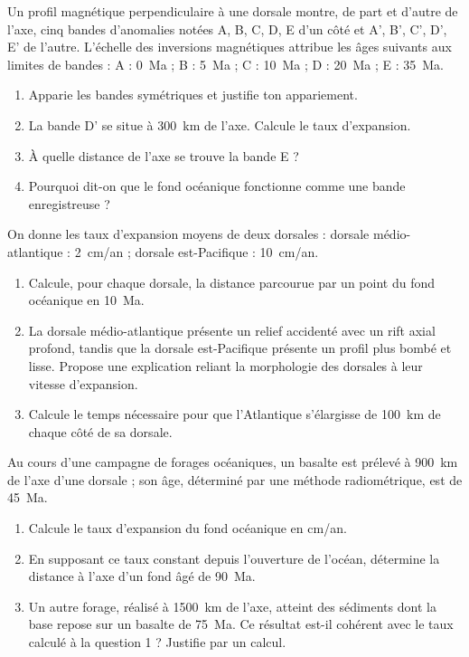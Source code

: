 \documentclass[11pt]{article}
\begin{document}
\begin{exercice}
Un profil magnétique perpendiculaire à une dorsale montre, de part et d'autre de l'axe, cinq bandes d'anomalies notées A, B, C, D, E d'un côté et A', B', C', D', E' de l'autre. L'échelle des inversions magnétiques attribue les âges suivants aux limites de bandes : A : \SI{0}{Ma} ; B : \SI{5}{Ma} ; C : \SI{10}{Ma} ; D : \SI{20}{Ma} ; E : \SI{35}{Ma}.
\begin{enumerate}
\item Apparie les bandes symétriques et justifie ton appariement.
\item La bande D' se situe à \SI{300}{km} de l'axe. Calcule le taux d'expansion.
\item À quelle distance de l'axe se trouve la bande E ?
\item Pourquoi dit-on que le fond océanique fonctionne comme une \og bande enregistreuse \fg{} ?
\end{enumerate}
\end{exercice}

\begin{exercice}
On donne les taux d'expansion moyens de deux dorsales : dorsale médio-atlantique : \SI{2}{cm/an} ; dorsale est-Pacifique : \SI{10}{cm/an}.
\begin{enumerate}
\item Calcule, pour chaque dorsale, la distance parcourue par un point du fond océanique en \SI{10}{Ma}.
\item La dorsale médio-atlantique présente un relief accidenté avec un rift axial profond, tandis que la dorsale est-Pacifique présente un profil plus bombé et lisse. Propose une explication reliant la morphologie des dorsales à leur vitesse d'expansion.
\item Calcule le temps nécessaire pour que l'Atlantique s'élargisse de \SI{100}{km} de chaque côté de sa dorsale.
\end{enumerate}
\end{exercice}

\begin{exercice}
Au cours d'une campagne de forages océaniques, un basalte est prélevé à \SI{900}{km} de l'axe d'une dorsale ; son âge, déterminé par une méthode radiométrique, est de \SI{45}{Ma}.
\begin{enumerate}
\item Calcule le taux d'expansion du fond océanique en cm/an.
\item En supposant ce taux constant depuis l'ouverture de l'océan, détermine la distance à l'axe d'un fond âgé de \SI{90}{Ma}.
\item Un autre forage, réalisé à \SI{1500}{km} de l'axe, atteint des sédiments dont la base repose sur un basalte de \SI{75}{Ma}. Ce résultat est-il cohérent avec le taux calculé à la question 1 ? Justifie par un calcul.
\end{enumerate}
\end{exercice}
\end{document}
